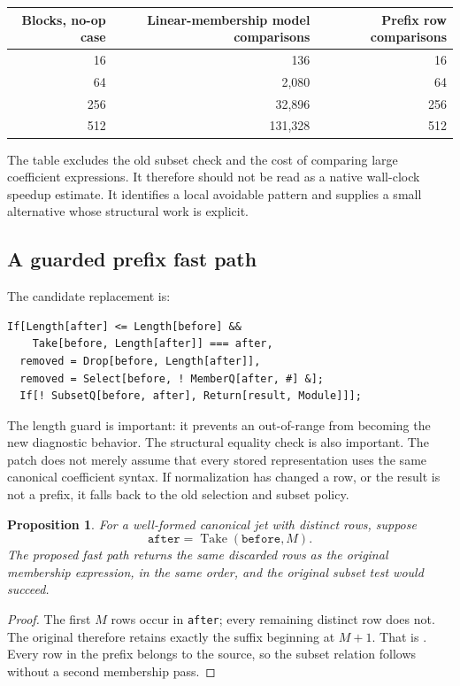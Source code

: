 \documentclass[11pt,a4paper]{article}
\newcommand{\code}[1]{\texttt{\detokenize{#1}}}
\newtheorem{proposition}{Proposition}[section]
\begin{document}
\begin{center}
\begin{tabular}{@{}rrr@{}}
\toprule Blocks, no-op case & Linear-membership model comparisons & Prefix row comparisons\\\midrule
16 & 136 & 16\\
64 & 2,080 & 64\\
256 & 32,896 & 256\\
512 & 131,328 & 512\\
\bottomrule
\end{tabular}
\end{center}
The table excludes the old subset check and the cost of comparing large
coefficient expressions. It therefore should not be read as a native wall-clock
speedup estimate. It identifies a local avoidable pattern and supplies a small
alternative whose structural work is explicit.

\subsection{A guarded prefix fast path}
The candidate replacement is:
\begin{lstlisting}
If[Length[after] <= Length[before] &&
    Take[before, Length[after]] === after,
  removed = Drop[before, Length[after]],
  removed = Select[before, ! MemberQ[after, #] &];
  If[! SubsetQ[before, after], Return[result, Module]]];
\end{lstlisting}
The length guard is important: it prevents an out-of-range \code{Take} from
becoming the new diagnostic behavior. The structural equality check is also
important. The patch does not merely assume that every stored representation
uses the same canonical coefficient syntax. If normalization has changed a row,
or the result is not a prefix, it falls back to the old selection and subset
policy.

\begin{proposition}\label{prop:prefix}
For a well-formed canonical jet with distinct rows, suppose
\[\texttt{after}=\operatorname{Take}(\texttt{before},M).\]
The proposed fast path returns the same discarded rows as the original membership expression, in the
same order, and the original subset test would succeed.
\end{proposition}
\begin{proof}
The first $M$ rows occur in \texttt{after}; every remaining distinct row does not.
The original \code{Select} therefore retains exactly the suffix beginning at
$M+1$. That is \code{Drop[before,M]}. Every row in the prefix belongs to the
source, so the subset relation follows without a second membership pass.
\end{proof}
\end{document}
